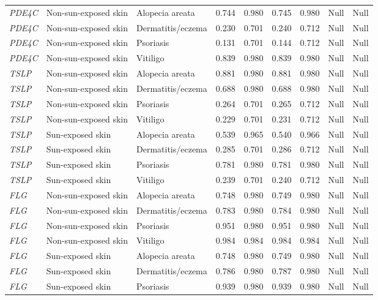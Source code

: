 \documentclass[10pt,a4paper]{article}
\begin{document}
\begin{landscape}
\begin{longtable}{p{1.7cm}p{3.2cm}p{2.8cm}p{2.2cm}p{2.2cm}p{2.2cm}p{2.2cm}p{3.0cm}p{3.0cm}}
\textit{PDE4C} & Non-sun-exposed skin & Alopecia areata & 0.744 & 0.980 & 0.745 & 0.980 & Null & Null \\
\textit{PDE4C} & Non-sun-exposed skin & Dermatitis/eczema & 0.230 & 0.701 & 0.240 & 0.712 & Null & Null \\
\textit{PDE4C} & Non-sun-exposed skin & Psoriasis & 0.131 & 0.701 & 0.144 & 0.712 & Null & Null \\
\textit{PDE4C} & Non-sun-exposed skin & Vitiligo & 0.839 & 0.980 & 0.839 & 0.980 & Null & Null \\
\textit{TSLP} & Non-sun-exposed skin & Alopecia areata & 0.881 & 0.980 & 0.881 & 0.980 & Null & Null \\
\textit{TSLP} & Non-sun-exposed skin & Dermatitis/eczema & 0.688 & 0.980 & 0.688 & 0.980 & Null & Null \\
\textit{TSLP} & Non-sun-exposed skin & Psoriasis & 0.264 & 0.701 & 0.265 & 0.712 & Null & Null \\
\textit{TSLP} & Non-sun-exposed skin & Vitiligo & 0.229 & 0.701 & 0.231 & 0.712 & Null & Null \\
\textit{TSLP} & Sun-exposed skin & Alopecia areata & 0.539 & 0.965 & 0.540 & 0.966 & Null & Null \\
\textit{TSLP} & Sun-exposed skin & Dermatitis/eczema & 0.285 & 0.701 & 0.286 & 0.712 & Null & Null \\
\textit{TSLP} & Sun-exposed skin & Psoriasis & 0.781 & 0.980 & 0.781 & 0.980 & Null & Null \\
\textit{TSLP} & Sun-exposed skin & Vitiligo & 0.239 & 0.701 & 0.240 & 0.712 & Null & Null \\
\textit{FLG} & Non-sun-exposed skin & Alopecia areata & 0.748 & 0.980 & 0.749 & 0.980 & Null & Null \\
\textit{FLG} & Non-sun-exposed skin & Dermatitis/eczema & 0.783 & 0.980 & 0.784 & 0.980 & Null & Null \\
\textit{FLG} & Non-sun-exposed skin & Psoriasis & 0.951 & 0.980 & 0.951 & 0.980 & Null & Null \\
\textit{FLG} & Non-sun-exposed skin & Vitiligo & 0.984 & 0.984 & 0.984 & 0.984 & Null & Null \\
\textit{FLG} & Sun-exposed skin & Alopecia areata & 0.748 & 0.980 & 0.749 & 0.980 & Null & Null \\
\textit{FLG} & Sun-exposed skin & Dermatitis/eczema & 0.786 & 0.980 & 0.787 & 0.980 & Null & Null \\
\textit{FLG} & Sun-exposed skin & Psoriasis & 0.939 & 0.980 & 0.939 & 0.980 & Null & Null \\

\end{longtable}
\end{landscape}
\end{document}
